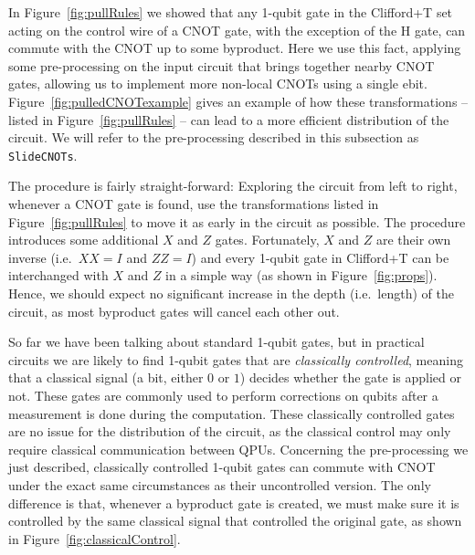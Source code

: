 
In Figure~\ref{fig:pullRules} we showed that any 1-qubit gate in the Clifford+T set acting on the control wire of a CNOT gate, with the exception of the H gate, can commute with the CNOT up to some byproduct. Here we use this fact, applying some pre-processing on the input circuit that brings together nearby CNOT gates, allowing us to implement more non-local CNOTs using a single ebit. Figure~\ref{fig:pulledCNOTexample} gives an example of how these transformations -- listed in Figure~\ref{fig:pullRules} -- can lead to a more efficient distribution of the circuit. We will refer to the pre-processing described in this subsection as \texttt{SlideCNOTs}.



The procedure is fairly straight-forward: Exploring the circuit from left to right, whenever a CNOT gate is found, use the transformations listed in Figure~\ref{fig:pullRules} to move it as early in the circuit as possible. The procedure introduces some additional \(X\) and \(Z\) gates. Fortunately, \(X\) and \(Z\) are their own inverse (i.e.\ \(XX = I\) and \(ZZ = I\)) and every 1-qubit gate in Clifford+T can be interchanged with \(X\) and \(Z\) in a simple way (as shown in Figure~\ref{fig:props}). Hence, we should expect no significant increase in the depth (i.e.\ length) of the circuit, as most byproduct gates will cancel each other out.

So far we have been talking about standard 1-qubit gates, but in practical circuits we are likely to find 1-qubit gates that are \textit{classically controlled}, meaning that a classical signal (a bit, either \(0\) or \(1\)) decides whether the gate is applied or not. These gates are commonly used to perform corrections on qubits after a measurement is done during the computation. These classically controlled gates are no issue for the distribution of the circuit, as the classical control may only require classical communication between QPUs. Concerning the pre-processing we just described, classically controlled 1-qubit gates can commute with CNOT under the exact same circumstances as their uncontrolled version. The only difference is that, whenever a byproduct gate is created, we must make sure it is controlled by the same classical signal that controlled the original gate, as shown in Figure~\ref{fig:classicalControl}.

